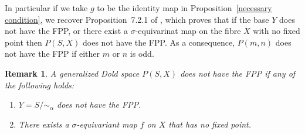 \documentclass{amsart}
\newtheorem{proposition}[theorem]{Proposition}
\newtheorem{remark}[theorem]{Remark}
\newcommand{\propref}[1]{Proposition~\ref{#1}}
\begin{document}

	
		In particular if we take $g$ to be the identity map in \propref{necessary condition}, we recover Proposition~7.2.1 of \cite{mandal}, which proves that if the base $Y$ does not have the FPP, or there exist a $\sigma$-equivarinat map on the fibre $X$ with no fixed point then $P(S,X)$ does not have the FPP. As a consequence, $P(m,n)$ does not have the FPP if either $m$ or $n$ is odd.
	\iffalse
	\begin{remark}\label{necessary criterion for FFP}
		A generalized Dold space $P(S,X)$ does not have the FPP if any of the following holds:
		
		\begin{enumerate}
			\item $Y=S/\!\!\sim _{\alpha}$ does not have the FPP.
			\item There exists a $\sigma$-equivariant map $f$ on $X$ that has no fixed point.
		\end{enumerate}
	\end{remark}
	
\end{document}
